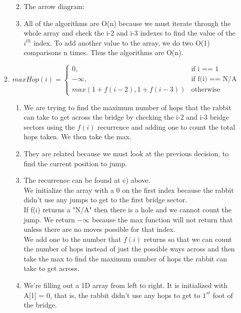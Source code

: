 \documentclass[11pt]{article}
\begin{document}
\begin{enumerate}
\begin{enumerate}
\begin{enumerate}
\vspace*{3cm}

\item
The arrow diagram:

\vspace*{3cm}

\item
All of the algorithms are O(n) because we must iterate through the whole array and check the i-2 and i-3 indexes to find the value of the $i^{th}$ index. To add another value to the array, we do two O(1) comparisons n times. Thus the algorithms are O(n).
\end{enumerate}
\item
\begin{equation}
maxHop (i)=\begin{cases}
0, & \text{if i == 1}\\
-\infty, & \text{if f(i) == N/A}\\
max (1 + f(i-2), 1 + f(i-3)) & \text{otherwise}
\end{cases}
\end{equation}
\begin{enumerate}
\item
We are trying to find the maximum number of hops that the rabbit can take to get across the bridge by checking the i-2 and i-3 bridge sectors using the $f(i)$ recurrence and adding one to count the total hops taken. We then take the max. 
\item
They are related because we must look at the previous decision, to find the current position to jump.
\item
The recurrence can be found at c) above.\\
We initialize the array with a 0 on the first index because the rabbit didn't use any jumps to get to the first bridge sector.\\
If f(i) returns a "N/A" then there is a hole and we cannot count the jump. We return $-\infty$ because the max function will not return that unless there are no moves possible for that index.\\
We add one to the number that $f(i)$ returns so that we can count the number of hops instead of just the possible ways across and then take the max to find the maximum number of hops the rabbit can take to get across.

\item
We're filling out a 1D array from left to right. It is initialized with A[1] = 0, that is, the rabbit didn't use any hops to get to $1^{st}$ foot of the bridge.



\end{enumerate}
\end{enumerate}
\end{enumerate}
\end{document}

